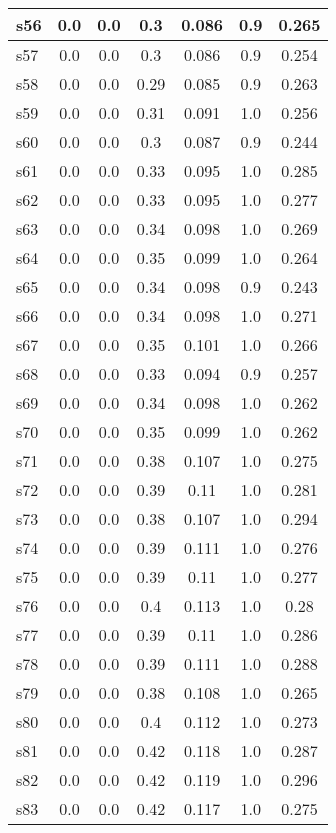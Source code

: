 \documentclass{article}
\begin{document}
\begin{tabular}{|l|c|c|c|c|c|c|}
\hline
s56 &0.0 & 0.0 & 0.3 & 0.086 & 0.9 & 0.265\\
\hline
s57 &0.0 & 0.0 & 0.3 & 0.086 & 0.9 & 0.254\\
\hline
s58 &0.0 & 0.0 & 0.29 & 0.085 & 0.9 & 0.263\\
\hline
s59 &0.0 & 0.0 & 0.31 & 0.091 & 1.0 & 0.256\\
\hline
s60 &0.0 & 0.0 & 0.3 & 0.087 & 0.9 & 0.244\\
\hline
s61 &0.0 & 0.0 & 0.33 & 0.095 & 1.0 & 0.285\\
\hline
s62 &0.0 & 0.0 & 0.33 & 0.095 & 1.0 & 0.277\\
\hline
s63 &0.0 & 0.0 & 0.34 & 0.098 & 1.0 & 0.269\\
\hline
s64 &0.0 & 0.0 & 0.35 & 0.099 & 1.0 & 0.264\\
\hline
s65 &0.0 & 0.0 & 0.34 & 0.098 & 0.9 & 0.243\\
\hline
s66 &0.0 & 0.0 & 0.34 & 0.098 & 1.0 & 0.271\\
\hline
s67 &0.0 & 0.0 & 0.35 & 0.101 & 1.0 & 0.266\\
\hline
s68 &0.0 & 0.0 & 0.33 & 0.094 & 0.9 & 0.257\\
\hline
s69 &0.0 & 0.0 & 0.34 & 0.098 & 1.0 & 0.262\\
\hline
s70 &0.0 & 0.0 & 0.35 & 0.099 & 1.0 & 0.262\\
\hline
s71 &0.0 & 0.0 & 0.38 & 0.107 & 1.0 & 0.275\\
\hline
s72 &0.0 & 0.0 & 0.39 & 0.11 & 1.0 & 0.281\\
\hline
s73 &0.0 & 0.0 & 0.38 & 0.107 & 1.0 & 0.294\\
\hline
s74 &0.0 & 0.0 & 0.39 & 0.111 & 1.0 & 0.276\\
\hline
s75 &0.0 & 0.0 & 0.39 & 0.11 & 1.0 & 0.277\\
\hline
s76 &0.0 & 0.0 & 0.4 & 0.113 & 1.0 & 0.28\\
\hline
s77 &0.0 & 0.0 & 0.39 & 0.11 & 1.0 & 0.286\\
\hline
s78 &0.0 & 0.0 & 0.39 & 0.111 & 1.0 & 0.288\\
\hline
s79 &0.0 & 0.0 & 0.38 & 0.108 & 1.0 & 0.265\\
\hline
s80 &0.0 & 0.0 & 0.4 & 0.112 & 1.0 & 0.273\\
\hline
s81 &0.0 & 0.0 & 0.42 & 0.118 & 1.0 & 0.287\\
\hline
s82 &0.0 & 0.0 & 0.42 & 0.119 & 1.0 & 0.296\\
\hline
s83 &0.0 & 0.0 & 0.42 & 0.117 & 1.0 & 0.275\\
\hline

\end{tabular}
\end{document}
